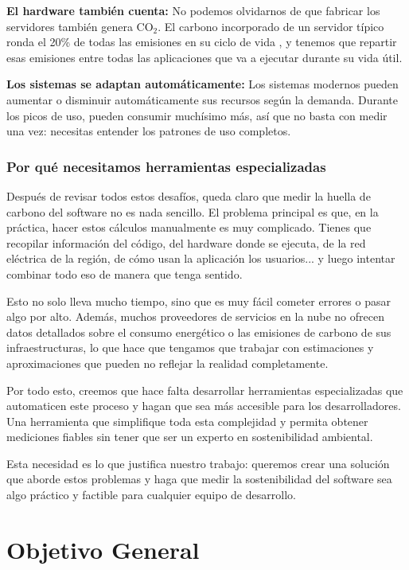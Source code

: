 \documentclass[12pt,a4paper]{report}
\begin{document}
\textbf{El hardware también cuenta:} No podemos olvidarnos de que fabricar los servidores también genera CO$_2$. El carbono incorporado de un servidor típico ronda el 20\% de todas las emisiones en su ciclo de vida \cite{ref9}, y tenemos que repartir esas emisiones entre todas las aplicaciones que va a ejecutar durante su vida útil.

\textbf{Los sistemas se adaptan automáticamente:} Los sistemas modernos pueden aumentar o disminuir automáticamente sus recursos según la demanda. Durante los picos de uso, pueden consumir muchísimo más, así que no basta con medir una vez: necesitas entender los patrones de uso completos.

\subsubsection{Por qué necesitamos herramientas especializadas}

Después de revisar todos estos desafíos, queda claro que medir la huella de carbono del software no es nada sencillo. El problema principal es que, en la práctica, hacer estos cálculos manualmente es muy complicado. Tienes que recopilar información del código, del hardware donde se ejecuta, de la red eléctrica de la región, de cómo usan la aplicación los usuarios... y luego intentar combinar todo eso de manera que tenga sentido.

Esto no solo lleva mucho tiempo, sino que es muy fácil cometer errores o pasar algo por alto. Además, muchos proveedores de servicios en la nube no ofrecen datos detallados sobre el consumo energético o las emisiones de carbono de sus infraestructuras, lo que hace que tengamos que trabajar con estimaciones y aproximaciones que pueden no reflejar la realidad completamente.

Por todo esto, creemos que hace falta desarrollar herramientas especializadas que automaticen este proceso y hagan que sea más accesible para los desarrolladores. Una herramienta que simplifique toda esta complejidad y permita obtener mediciones fiables sin tener que ser un experto en sostenibilidad ambiental.

Esta necesidad es lo que justifica nuestro trabajo: queremos crear una solución que aborde estos problemas y haga que medir la sostenibilidad del software sea algo práctico y factible para cualquier equipo de desarrollo.

\section{Objetivo General}
\end{document}
